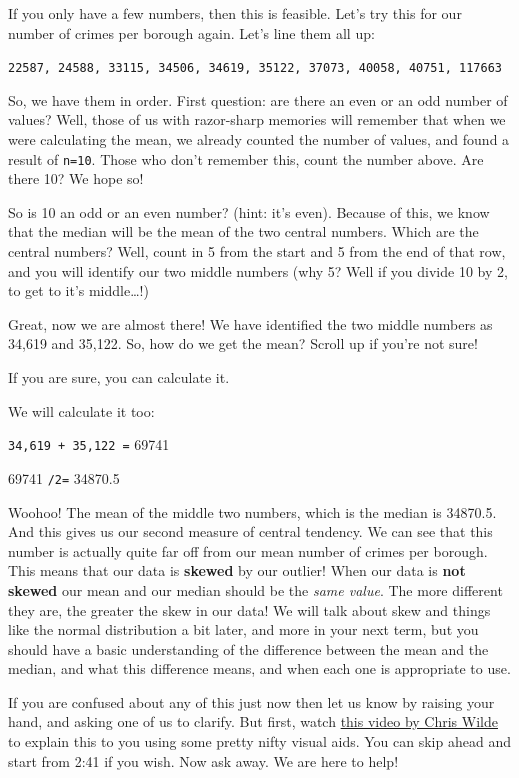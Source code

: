 \documentclass[
]{book}
\begin{document}
If you only have a few numbers, then this is feasible. Let's try this for our number of crimes per borough again. Let's line them all up:

\texttt{22587,\ 24588,\ 33115,\ 34506,\ 34619,\ 35122,\ 37073,\ 40058,\ 40751,\ 117663}

So, we have them in order. First question: are there an even or an odd number of values? Well, those of us with razor-sharp memories will remember that when we were calculating the mean, we already counted the number of values, and found a result of \texttt{n=10}. Those who don't remember this, count the number above. Are there 10? We hope so!

So is 10 an odd or an even number? (hint: it's even). Because of this, we know that the median will be the mean of the two central numbers. Which are the central numbers? Well, count in 5 from the start and 5 from the end of that row, and you will identify our two middle numbers (why 5? Well if you divide 10 by 2, to get to it's middle\ldots!)

Great, now we are almost there! We have identified the two middle numbers as 34,619 and 35,122. So, how do we get the mean? Scroll up if you're not sure!

If you are sure, you can calculate it.

We will calculate it too:

\texttt{34,619\ +\ 35,122\ =} 69741

69741 \texttt{/2=} 34870.5

Woohoo! The mean of the middle two numbers, which is the median is 34870.5. And this gives us our second measure of central tendency. We can see that this number is actually quite far off from our mean number of crimes per borough. This means that our data is \textbf{skewed} by our outlier! When our data is \textbf{not skewed} our mean and our median should be the \emph{same value}. The more different they are, the greater the skew in our data! We will talk about skew and things like the normal distribution a bit later, and more in your next term, but you should have a basic understanding of the difference between the mean and the median, and what this difference means, and when each one is appropriate to use.

If you are confused about any of this just now then let us know by raising your hand, and asking one of us to clarify. But first, watch \href{https://www.youtube.com/watch?v=U3lk2nQYfAQ\&amp=\&list=PL8CRAVedURQrlxeFfme0TEgaj1_h67JUR\&amp=\&index=4}{this video by Chris Wilde} to explain this to you using some pretty nifty visual aids. You can skip ahead and start from 2:41 if you wish. Now ask away. We are here to help!
\end{document}
